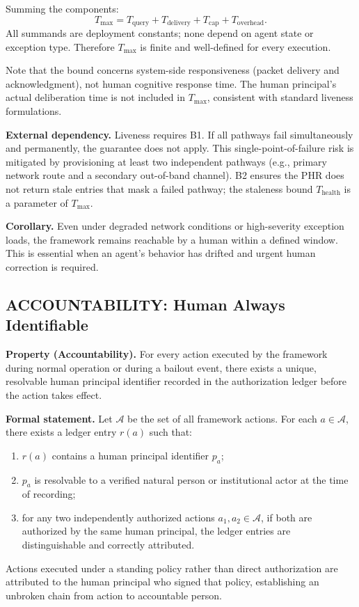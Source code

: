 Summing the components:
\[
T_{\max} = T_{\text{query}} + T_{\text{delivery}} + T_{\text{cap}} + T_{\text{overhead}} .
\]
All summands are deployment constants; none depend on agent state or exception type. Therefore $T_{\max}$ is finite and well-defined for every execution.

Note that the bound concerns system-side responsiveness (packet delivery and acknowledgment), not human cognitive response time. The human principal's actual deliberation time is not included in $T_{\max}$, consistent with standard liveness formulations.

\medskip\noindent\textbf{External dependency.} Liveness requires B1. If all pathways fail simultaneously and permanently, the guarantee does not apply. This single-point-of-failure risk is mitigated by provisioning at least two independent pathways (e.g., primary network route and a secondary out-of-band channel). B2 ensures the PHR does not return stale entries that mask a failed pathway; the staleness bound $T_{\text{health}}$ is a parameter of $T_{\max}$.

\medskip\noindent\textbf{Corollary.} Even under degraded network conditions or high-severity exception loads, the framework remains reachable by a human within a defined window. This is essential when an agent's behavior has drifted and urgent human correction is required.

\subsection{ACCOUNTABILITY: Human Always Identifiable}\label{sec:accountability}

\textbf{Property (Accountability).} For every action executed by the framework during normal operation or during a bailout event, there exists a unique, resolvable human principal identifier recorded in the authorization ledger before the action takes effect.

\textbf{Formal statement.} Let $\mathcal{A}$ be the set of all framework actions. For each $a \in \mathcal{A}$, there exists a ledger entry $r(a)$ such that:
\begin{enumerate}\itemsep0em
    \item[(i)] $r(a)$ contains a human principal identifier $p_a$;
    \item[(ii)] $p_a$ is resolvable to a verified natural person or institutional actor at the time of recording;
    \item[(iii)] for any two independently authorized actions $a_1, a_2 \in \mathcal{A}$, if both are authorized by the same human principal, the ledger entries are distinguishable and correctly attributed.
\end{enumerate}
Actions executed under a standing policy rather than direct authorization are attributed to the human principal who signed that policy, establishing an unbroken chain from action to accountable person.

